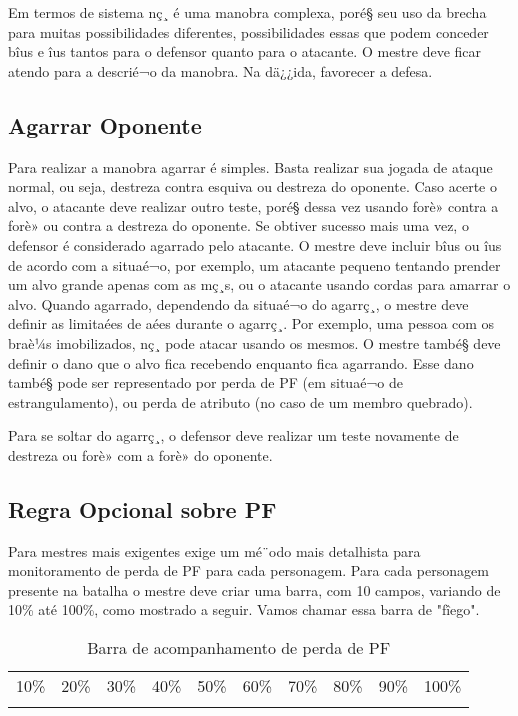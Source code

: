 Em termos de sistema nç¸ é uma manobra complexa, poré§ seu uso da brecha para muitas possibilidades diferentes, possibilidades essas que podem conceder bîus e îus tantos para o defensor quanto para o atacante. O mestre deve ficar atendo para a descrié¬o da manobra. Na dä¿¿ida, favorecer a defesa.

\subsection{Agarrar Oponente}

Para realizar a manobra agarrar é simples. Basta realizar sua jogada de ataque normal, ou seja, destreza contra esquiva ou destreza do oponente. Caso acerte o alvo, o atacante deve realizar outro teste, poré§ dessa vez usando forè» contra a forè» ou contra a destreza do oponente. Se obtiver sucesso mais uma vez, o defensor é considerado agarrado pelo atacante. O mestre deve incluir bîus ou îus de acordo com a situaé¬o, por exemplo, um atacante pequeno tentando prender um alvo grande apenas com as mç¸s, ou o atacante usando cordas para amarrar o alvo. Quando agarrado, dependendo da situaé¬o do agarrç¸, o mestre deve definir as limitaées de aées durante o agarrç¸. Por exemplo, uma pessoa com os braè¼s imobilizados, nç¸ pode atacar usando os mesmos. O mestre també§ deve definir o dano que o alvo fica recebendo enquanto fica agarrando. Esse dano també§ pode ser representado por perda de PF (em situaé¬o de estrangulamento), ou perda de atributo (no caso de um membro quebrado).

Para se soltar do agarrç¸, o defensor deve realizar um teste novamente de destreza ou forè» com a forè» do oponente.

\subsection{Regra Opcional sobre PF}

Para mestres mais exigentes exige um mé¨odo mais detalhista para monitoramento de perda de PF para cada personagem. Para cada personagem presente na batalha o mestre deve criar uma barra, com 10 campos, variando de 10\% até 100\%, como mostrado a seguir. Vamos chamar essa barra de "fîego".

\begin{table}[htbp]
\begin{center}
\begin{tabular}{|c|c|c|c|c|c|c|c|c|c|} \hline 
10\%&	 20\%&	30\%&	 40\%&	 50\%&	 60\%&	 70\%&	 80\%&	 90\%&	 100\%\\\cline{1-10} 
 &  &   & &  &  &  &  &   &  
\\ \hline
\end{tabular}
\end{center}
\caption{Barra de acompanhamento de perda de PF}
\label{}
\end{table}

